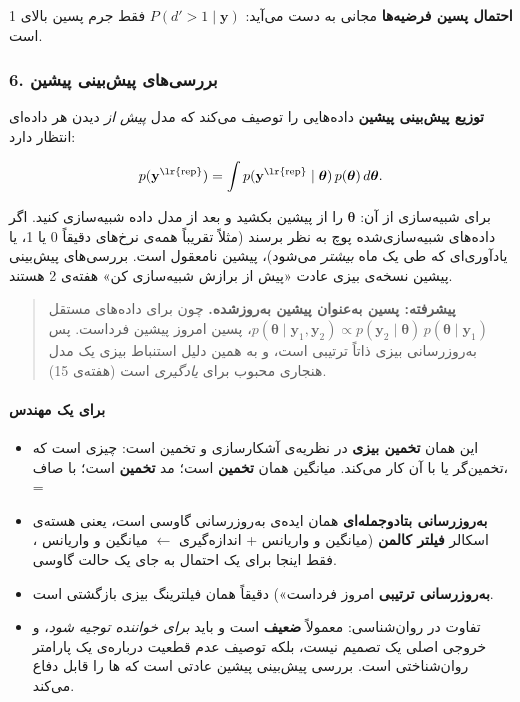 \textbf{احتمال پسین فرضیه‌ها} مجانی به دست می‌آید:
\(P(d' > 1 \mid \mathbf{y})\) فقط جرم پسین بالای 1 است.

\subsubsection{\texorpdfstring{6. بررسی‌های پیش‌بینی پیشین }{6. بررسی‌های پیش‌بینی پیشین (prior predictive checks)}}

\textbf{توزیع پیش‌بینی پیشین} داده‌هایی را توصیف می‌کند که مدل \emph{پیش
از} دیدن هر داده‌ای انتظار دارد:

\[
p(\mathbf{y}^{\text{\lr{rep}}}) = \int p(\mathbf{y}^{\text{\lr{rep}}}\mid\boldsymbol\theta)\, p(\boldsymbol\theta)\, d\boldsymbol\theta.
\]

برای شبیه‌سازی از آن: \(\boldsymbol\theta\) را از پیشین بکشید و بعد از
مدل داده شبیه‌سازی کنید. اگر داده‌های شبیه‌سازی‌شده پوچ به نظر برسند (مثلاً
تقریباً همه‌ی نرخ‌های  دقیقاً 0 یا 1، یا یادآوری‌ای که طی یک ماه
\emph{بیشتر} می‌شود)، پیشین نامعقول است. بررسی‌های پیش‌بینی پیشین نسخه‌ی
بیزی عادت «پیش از برازش شبیه‌سازی کن» هفته‌ی 2 هستند.

\begin{quote}
\textbf{پیشرفته: پسین به‌عنوان پیشین به‌روزشده.} چون برای داده‌های مستقل
\(p(\boldsymbol\theta\mid\mathbf{y}_1,\allowbreak \mathbf{y}_2) \propto p(\mathbf{y}_2\mid\boldsymbol\theta)\, p(\boldsymbol\theta\mid\mathbf{y}_1)\)،
پسین امروز پیشین فرداست. پس به‌روزرسانی بیزی ذاتاً ترتیبی است، و به همین
دلیل استنباط بیزی یک مدل هنجاری محبوب برای \emph{یادگیری} است (هفته‌ی
15).
\end{quote}

\paragraph{برای یک مهندس}

\begin{itemize}
\tightlist
\item
  این همان \textbf{تخمین بیزی} در نظریه‌ی آشکارسازی و تخمین است:
   چیزی است که تخمین‌گر  یا  با آن کار
  می‌کند. میانگین  همان \textbf{تخمین } است؛ مد
   \textbf{تخمین } است؛ با  صاف،
   = 
\item
  \textbf{به‌روزرسانی  بتا\lr{--}دوجمله‌ای} همان ایده‌ی به‌روزرسانی
   گاوسی است، یعنی هسته‌ی اسکالر \textbf{فیلتر کالمن}
  (میانگین و واریانس  + اندازه‌گیری \ensuremath{\leftarrow} میانگین و واریانس
  ، فقط اینجا برای یک احتمال به جای یک حالت گاوسی.
\item
  \textbf{به‌روزرسانی ترتیبی}  امروز  فرداست»)
  دقیقاً همان فیلترینگ بیزی بازگشتی است.
\item
  تفاوت در روان‌شناسی:  معمولاً \textbf{ضعیف} است و باید
  \emph{برای خواننده توجیه شود}، و خروجی اصلی یک تصمیم نیست، بلکه توصیف
  عدم قطعیت درباره‌ی یک پارامتر روان‌شناختی است. بررسی پیش‌بینی پیشین
   عادتی است که ها را قابل دفاع
  می‌کند.
\end{itemize}

